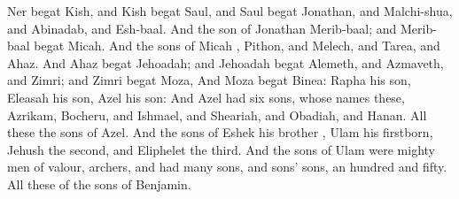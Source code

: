 {Ner
begat
Kish, and
Kish
begat
Saul, and
Saul
begat
Jonathan, and
Malchi-shua, and
Abinadab, and
Esh-baal.
And the
son of
Jonathan
{}
Merib-baal; and
Merib-baal
begat
Micah.
And the
sons of
Micah
{},
Pithon, and
Melech, and
Tarea, and
Ahaz.
And
Ahaz
begat
Jehoadah; and
Jehoadah
begat
Alemeth, and
Azmaveth, and
Zimri; and
Zimri
begat
Moza,
And
Moza
begat
Binea:
Rapha
{} his
son,
Eleasah his
son,
Azel his
son:
And
Azel had
six
sons, whose
names
{} these,
Azrikam,
Bocheru, and
Ishmael, and
Sheariah, and
Obadiah, and
Hanan. All these
{} the
sons of
Azel.
And the
sons of
Eshek his
brother
{},
Ulam his
firstborn,
Jehush the
second, and
Eliphelet the
third.
And the
sons of
Ulam were
mighty
men of
valour,
archers, and had
many
sons, and
sons’
sons, an
hundred and
fifty. All these
{} of the
sons of
Benjamin.

}
